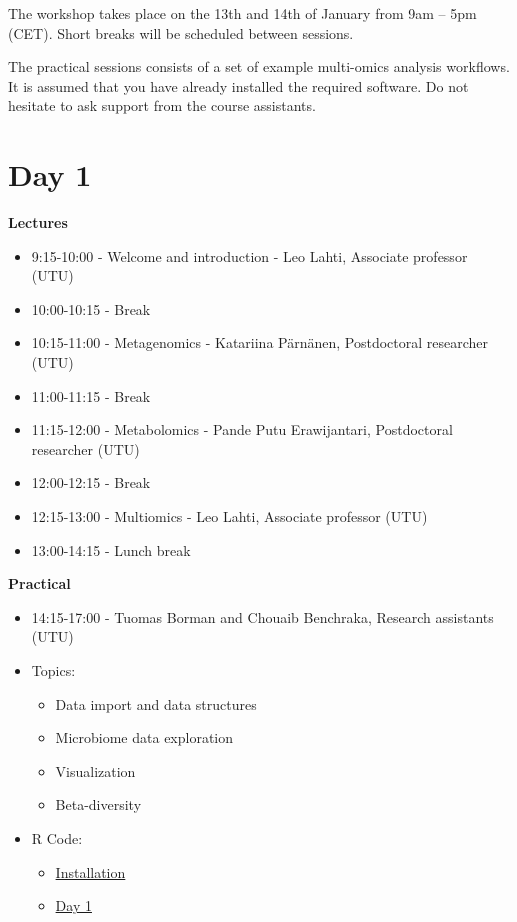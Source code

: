 \documentclass[
  oneside]{book}
\begin{document}
The workshop takes place on the 13th and 14th of January from 9am -- 5pm
(CET). Short breaks will be scheduled between sessions.

The practical sessions consists of a set of example
multi-omics analysis workflows. It is assumed that you
have already installed the required software. Do not hesitate to ask
support from the course assistants.

\hypertarget{day-1}{%
\section{Day 1}\label{day-1}}

\textbf{Lectures}

\begin{itemize}
\item
  9:15-10:00 - Welcome and introduction - Leo Lahti, Associate professor (UTU)
\item
  10:00-10:15 - Break
\item
  10:15-11:00 - Metagenomics - Katariina Pärnänen, Postdoctoral researcher (UTU)
\item
  11:00-11:15 - Break
\item
  11:15-12:00 - Metabolomics - Pande Putu Erawijantari, Postdoctoral researcher (UTU)
\item
  12:00-12:15 - Break
\item
  12:15-13:00 - Multiomics - Leo Lahti, Associate professor (UTU)
\item
  13:00-14:15 - Lunch break
\end{itemize}

\textbf{Practical}

\begin{itemize}
\item
  14:15-17:00 - Tuomas Borman and Chouaib Benchraka, Research assistants (UTU)
\item
  Topics:

  \begin{itemize}
  \item
    Data import and data structures
  \item
    Microbiome data exploration
  \item
    Visualization
  \item
    Beta-diversity
  \end{itemize}
\item
  R Code:

  \begin{itemize}
  \item
    \href{install_script.R}{Installation}
  \item
    \href{Day_1.R}{Day 1}
  \end{itemize}
\end{itemize}
\end{document}
